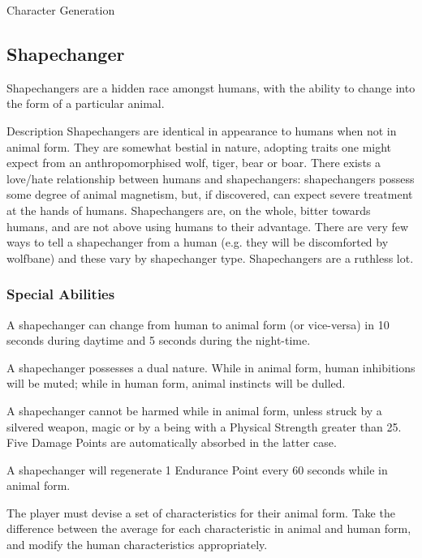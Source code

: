 \begin{Chapter}{Character Generation}
\subsection{Shapechanger}


Shapechangers are a hidden race amongst humans, with the ability to
change into the form of a particular animal.

\begin{Description}
\item[Description] Shapechangers are identical in appearance to humans
  when not in animal form.  They are somewhat bestial in nature,
  adopting traits one might expect from an anthropomorphised wolf,
  tiger, bear or boar.  There exists a love/hate relationship between
  humans and shapechangers: shapechangers possess some degree of
  animal magnetism, but, if discovered, can expect severe treatment at
  the hands of humans.  Shapechangers are, on the whole, bitter
  towards humans, and are not above using humans to their advantage.
  There are very few ways to tell a shapechanger from a human (e.g.
  they will be discomforted by wolfbane) and these vary by
  shapechanger type.  Shapechangers are a ruthless lot.
\end{Description}

\subsubsection{Special Abilities}

\begin{Enumerate}

\item A shapechanger can change from human to animal form (or
  vice-versa) in 10 seconds during daytime and 5 seconds during the
  night-time.

\item A shapechanger possesses a dual nature.  While in animal form,
  human inhibitions will be muted; while in human form, animal
  instincts will be dulled.

\item A shapechanger cannot be harmed while in animal form, unless
  struck by a silvered weapon, magic or by a being with a Physical
  Strength greater than 25.  Five Damage Points are automatically
  absorbed in the latter case.

\item A shapechanger will regenerate 1 Endurance Point every 60
  seconds while in animal form.

\item The player must devise a set of characteristics for their animal
  form. Take the difference between the average for each
  characteristic in animal and human form, and modify the human
  characteristics appropriately.


\end{Enumerate}
\end{Chapter}
